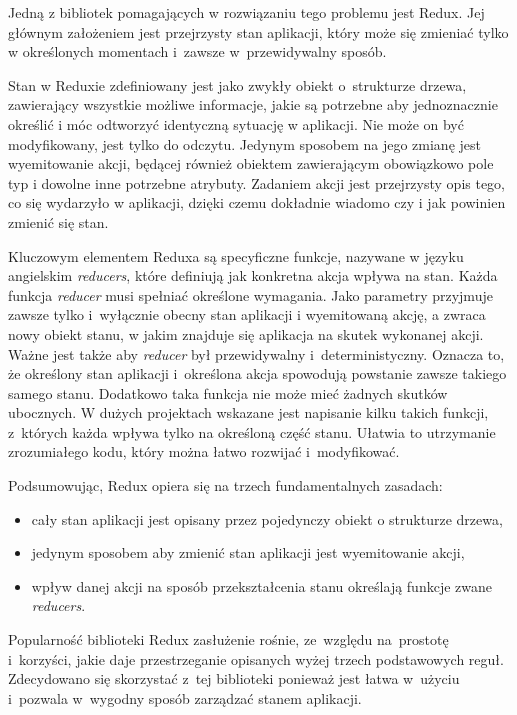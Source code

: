 \documentclass[12pt,a4paper,polish,thesis]{dcsbook}
\begin{document}
{	Jedną z bibliotek pomagających w rozwiązaniu tego problemu jest Redux. Jej głównym założeniem jest przejrzysty stan aplikacji, który może się zmieniać tylko w określonych momentach i~zawsze w~przewidywalny sposób.

	Stan w Reduxie zdefiniowany jest jako zwykły obiekt o~strukturze drzewa, zawierający wszystkie możliwe informacje, jakie są potrzebne aby jednoznacznie określić i móc odtworzyć identyczną sytuację w aplikacji. Nie może on być modyfikowany, jest tylko do odczytu. Jedynym sposobem na jego zmianę jest wyemitowanie akcji, będącej również obiektem zawierającym obowiązkowo pole typ i dowolne inne potrzebne atrybuty. Zadaniem akcji jest przejrzysty opis tego, co się wydarzyło w aplikacji, dzięki czemu dokładnie wiadomo czy i jak powinien zmienić się stan.

	Kluczowym elementem Reduxa są specyficzne funkcje, nazywane w języku angielskim \textit{reducers}, które definiują jak konkretna akcja wpływa na stan. Każda funkcja \textit{reducer} musi spełniać określone wymagania. Jako parametry przyjmuje zawsze tylko i~wyłącznie obecny stan aplikacji i wyemitowaną akcję, a zwraca nowy obiekt stanu, w jakim znajduje się aplikacja na skutek wykonanej akcji. Ważne jest także aby \textit{reducer} był przewidywalny i~deterministyczny. Oznacza to, że określony stan aplikacji i~określona akcja spowodują powstanie zawsze takiego samego stanu. Dodatkowo taka funkcja nie może mieć żadnych skutków ubocznych. W dużych projektach wskazane jest napisanie kilku takich funkcji, z~których każda wpływa tylko na określoną część stanu. Ułatwia to utrzymanie zrozumiałego kodu, który można łatwo rozwijać i~modyfikować.

	Podsumowując, Redux opiera się na trzech fundamentalnych zasadach:
	\begin{itemize}
		\item cały stan aplikacji jest opisany przez pojedynczy obiekt o strukturze drzewa,
		\item jedynym sposobem aby zmienić stan aplikacji jest wyemitowanie akcji,
		\item wpływ danej akcji na sposób przekształcenia stanu określają funkcje zwane \textit{reducers}.
	\end{itemize}

	Popularność biblioteki Redux zasłużenie rośnie, ze~względu na~prostotę i~korzyści, jakie daje przestrzeganie opisanych wyżej trzech podstawowych reguł. Zdecydowano się skorzystać z~tej biblioteki ponieważ jest łatwa w~użyciu i~pozwala w~wygodny sposób zarządzać stanem aplikacji.

}
\end{document}
